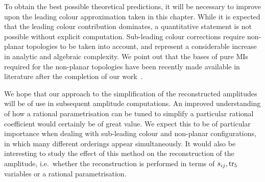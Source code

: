 \documentclass[main.tex]{subfiles}
\begin{document}
To obtain the best possible theoretical predictions, it will be necessary to improve upon the leading
colour approximation taken in this chapter. While it is expected that the leading colour contribution
dominates, a quantitative statement is not possible without explicit computation. Sub-leading colour
corrections require non-planar topologies to be taken into account, and represent a considerable
increase in analytic and algebraic complexity. We point out that the bases of pure MIs required for the non-planar topologies have been recently made available in literature after the completion of our work~\cite{Abreu:2023rco}.

We hope that our approach to the simplification of the reconstructed amplitudes will be of use in
subsequent amplitude computations. An improved understanding of how a rational parametrisation can
be tuned to simplify a particular rational coefficient would certainly be of great value. We expect
this to be of particular importance when dealing with sub-leading colour and non-planar
configurations, in which many different orderings appear simultaneously. It would also be interesting
to study the effect of this method on the reconstruction of the amplitude, i.e.\ whether the
reconstruction is performed in terms of $s_{ij}, \operatorname{\rm tr}_5$ variables or a rational parametrisation.
\end{document}
